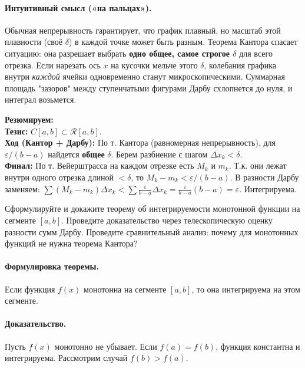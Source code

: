 \paragraph{Интуитивный смысл («на пальцах»).}
Обычная непрерывность гарантирует, что график плавный, но масштаб этой плавности (своё $\delta$) в каждой точке может быть разным. Теорема Кантора спасает ситуацию: она разрешает выбрать \textbf{одно общее, самое строгое $\delta$} для всего отрезка. Если нарезать ось $x$ на кусочки мельче этого $\delta$, колебания графика внутри \textit{каждой} ячейки одновременно станут микроскопическими. Суммарная площадь "зазоров" между ступенчатыми фигурами Дарбу схлопнется до нуля, и интеграл возьмется.

\begin{tcolorbox}[colback=gray!5, colframe=black, boxrule=0.5pt, arc=0pt]
\textbf{Резюмируем:} \\
\textbf{Тезис:} $C[a,b] \subset \mathcal{R}[a,b]$. \\
\textbf{Ход (Кантор + Дарбу):} По т. Кантора (равномерная непрерывность), для $\varepsilon/(b-a)$ найдется \textbf{общее} $\delta$. Берем разбиение с шагом $\Delta x_k < \delta$. \\
\textbf{Финал:} По т. Вейерштрасса на каждом отрезке есть $M_k$ и $m_k$. Т.к. они лежат внутри одного отрезка длиной $<\delta$, то $M_k - m_k < \varepsilon/(b-a)$. В разности Дарбу заменяем: $\sum (M_k-m_k)\Delta x_k < \sum \frac{\varepsilon}{b-a}\Delta x_k = \frac{\varepsilon}{b-a}(b-a) = \varepsilon$. Интегрируема.
\end{tcolorbox}







{Сформулируйте и докажите теорему об интегрируемости монотонной функции на сегменте $[a, b]$. Проведите доказательство через телескопическую оценку разности сумм Дарбу. Проведите сравнительный анализ: почему для монотонных функций не нужна теорема Кантора?}

\paragraph{Формулировка теоремы.}
Если функция $f(x)$ монотонна на сегменте $[a, b]$, то она интегрируема на этом сегменте.

\paragraph{Доказательство.}
Пусть $f(x)$ монотонно не убывает. Если $f(a) = f(b)$, функция константна и интегрируема. Рассмотрим случай $f(b) > f(a)$.

